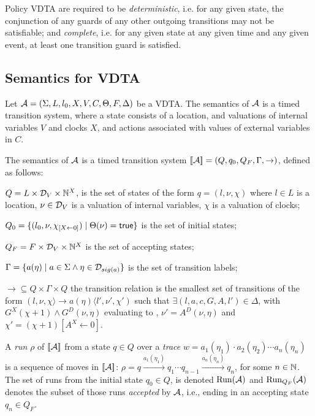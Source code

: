 Policy \ac{VDTA} are required to be \textit{deterministic}, i.e. for any given state, the conjunction of any guards of any other outgoing transitions may not be satisfiable; and \textit{complete}, i.e. for any given state at any given time and any given event, at least one transition guard is satisfied.

\subsection{Semantics for \ac{VDTA}}

Let ${\mathcal A} = \left(\Sigma, L, {l_0}, X, V, C, \Theta, F,  \Delta \right)$  be a VDTA.
The semantics of ${\mathcal A}$ is a timed transition system,
where a state consists of a location, and valuations of internal variables $V$ and clocks $X$, and actions associated with values of external variables in $C$.

\begin{definition}
	\label{def:vdta:semantics}
	The semantics of ${\mathcal A}$ is a timed transition system $[\![{\mathcal A}]\!]=( Q, q_0, Q_F, \Gamma, \to )$, defined as follows:
	\squishlist
	\item $Q = L \times {\cal D}_V \times \mathbb{N}^X$, is the set of states of the form $q= ( l,\nu ,\chi )$ where
	$l \in L$ is a location,
	$\nu \in {\cal D}_V$ is a valuation of internal variables,
	$\chi$ is a valuation of clocks;
	\item $Q_0 = \{ ( l_0,\nu, \chi_{[X \leftarrow 0]} )  \mid \Theta(\nu)=\mathsf{true} \}$ is the set of initial states;
	\item $Q_F = F \times {\cal D}_V \times \mathbb{N}^X$ is the set of accepting states;
	\item $\Gamma = \{ a(\eta) \mid
	a \in \Sigma \wedge \eta \in {\cal D}_{sig(a)}  \}$ is the set of transition labels;
	\item $\to\subseteq Q\times \Gamma\times Q$  the transition relation
	is the smallest set of transitions of the form
	$( l,\nu,\chi \rangle \longrightarrow {a(\eta)} \langle l',\nu',\chi')$
	such that  $\exists ( l, a, c, G, A, l' ) \in \Delta$,
	with $G^X(\chi + 1) \wedge G^D(\nu, \eta) $ evaluating to {\true},
	$\nu'= A^D(\nu, \eta)$ and $\chi'=(\chi+1)[A^X \leftarrow 0]$.
	\squishend
\end{definition}


A {\em run} $\rho$ of $[\![{\mathcal A}]\!]$ from a state $q\in Q$ over a {\em trace} $w =  a_1(\eta_1)\cdot a_2(\eta_2)\cdots a_n(\eta_n)$ is a sequence of moves in $[\![{\mathcal A}]\!]$:
$\rho = q \xrightarrow {a_1(\eta_1)} q_1
\cdots q_{n-1}\xrightarrow {a_n(\eta_n)} q_{n}$,
for some $n\in\mathbb{N}$.
The set of runs from the initial state $q_0\in Q$,  is denoted $\operatorname{Run}({\mathcal A})$ and $\operatorname{Run}_{Q_F}({\mathcal A})$ denotes the subset of those runs {\em accepted} by ${\mathcal A}$, i.e.,  ending in an accepting state $q_n \in Q_F$.

